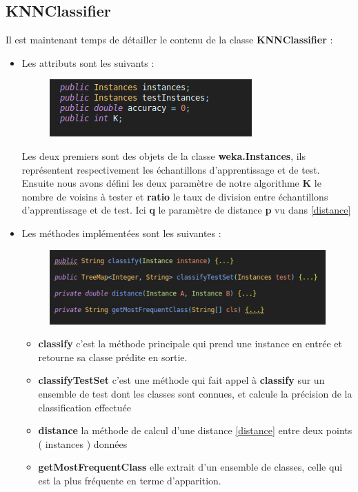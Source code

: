 		\subsection{KNNClassifier} 
		Il est maintenant temps de détailler le contenu de la classe \textbf{KNNClassifier} : 
		\begin{itemize}
			\item Les attributs sont les suivants : 
			\begin{figure}[H]
				\centering
				\includegraphics[width=0.75\linewidth]{knn/images/props.png}
			\end{figure}
			\par 
			Les deux premiers sont des objets de la classe \textbf{weka.Instances}, ils représentent respectivement les échantillons d'apprentissage et de test. Ensuite nous avons défini les deux paramètre de notre algorithme \textbf{K} le nombre de voisins à tester et \textbf{ratio} le taux de division entre échantillons d'apprentissage et de test. Ici \textbf{q} le paramètre de distance \textbf{p} vu dans \ref{distance}
			
			
			\item Les méthodes implémentées sont les suivantes : 
				\begin{figure}[H]
				\centering
				\includegraphics[width=0.75\linewidth]{knn/images/meths.png}
			\end{figure}
			\begin{itemize}
				\item \textbf{classify} c'est la méthode principale qui prend une instance en entrée et retourne sa classe prédite en sortie.
				\item \textbf{classifyTestSet} c'est une méthode qui fait appel à \textbf{classify} sur un ensemble de test dont les classes sont connues, et calcule la précision de la classification effectuée
				\item \textbf{distance} la méthode de calcul d'une distance \ref{distance} entre deux points ( instances ) données
				\item \textbf{getMostFrequentClass} elle extrait d'un ensemble de classes, celle qui est la plus fréquente en terme d'apparition.
			\end{itemize}
		\end{itemize}
